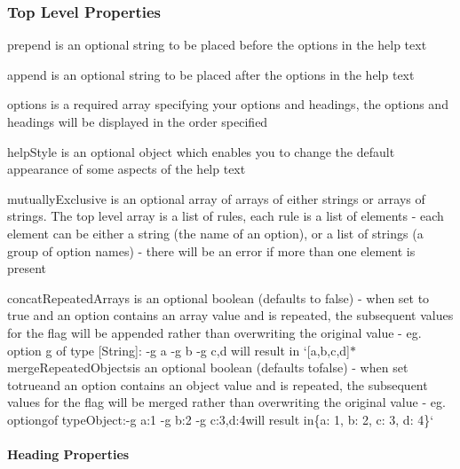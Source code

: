 \subsubsection*{Top Level Properties}


\begin{DoxyItemize}
\item {\ttfamily prepend} is an optional string to be placed before the options in the help text
\item {\ttfamily append} is an optional string to be placed after the options in the help text
\item {\ttfamily options} is a required array specifying your options and headings, the options and headings will be displayed in the order specified
\item {\ttfamily help\+Style} is an optional object which enables you to change the default appearance of some aspects of the help text
\item {\ttfamily mutually\+Exclusive} is an optional array of arrays of either strings or arrays of strings. The top level array is a list of rules, each rule is a list of elements -\/ each element can be either a string (the name of an option), or a list of strings (a group of option names) -\/ there will be an error if more than one element is present
\item {\ttfamily concat\+Repeated\+Arrays} is an optional boolean (defaults to {\ttfamily false}) -\/ when set to {\ttfamily true} and an option contains an array value and is repeated, the subsequent values for the flag will be appended rather than overwriting the original value -\/ eg. option {\ttfamily g} of type {\ttfamily \mbox{[}String\mbox{]}}\+: {\ttfamily -\/g a -\/g b -\/g c,d} will result in `\mbox{[}\textquotesingle{}a\textquotesingle{},\textquotesingle{}b\textquotesingle{},\textquotesingle{}c\textquotesingle{},\textquotesingle{}d\textquotesingle{}\mbox{]}{\ttfamily  $\ast$}merge\+Repeated\+Objects{\ttfamily is an optional boolean (defaults to}false{\ttfamily ) -\/ when set to}true{\ttfamily and an option contains an object value and is repeated, the subsequent values for the flag will be merged rather than overwriting the original value -\/ eg. option}g{\ttfamily of type}Object{\ttfamily \+:}-\/g a\+:1 -\/g b\+:2 -\/g c\+:3,d\+:4{\ttfamily will result in}\{a\+: 1, b\+: 2, c\+: 3, d\+: 4\}`
\end{DoxyItemize}

\paragraph*{Heading Properties}


